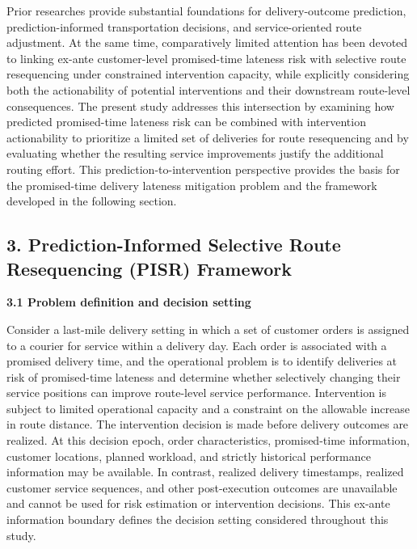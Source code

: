 \documentclass[
]{article}
\begin{document}
Prior researches provide substantial foundations for delivery-outcome
prediction, prediction-informed transportation decisions, and
service-oriented route adjustment. At the same time, comparatively
limited attention has been devoted to linking ex-ante customer-level
promised-time lateness risk with selective route resequencing under
constrained intervention capacity, while explicitly considering both the
actionability of potential interventions and their downstream
route-level consequences. The present study addresses this intersection
by examining how predicted promised-time lateness risk can be combined
with intervention actionability to prioritize a limited set of
deliveries for route resequencing and by evaluating whether the
resulting service improvements justify the additional routing effort.
This prediction-to-intervention perspective provides the basis for the
promised-time delivery lateness mitigation problem and the framework
developed in the following section.

\subsection{\texorpdfstring{\textbf{3. Prediction-Informed Selective
Route Resequencing (PISR)
Framework}}{3. Prediction-Informed Selective Route Resequencing (PISR) Framework}}\label{prediction-informed-selective-route-resequencing-pisr-framework}

\textbf{3.1 Problem definition and decision setting}

Consider a last-mile delivery setting in which a set of customer orders
is assigned to a courier for service within a delivery day. Each order
is associated with a promised delivery time, and the operational problem
is to identify deliveries at risk of promised-time lateness and
determine whether selectively changing their service positions can
improve route-level service performance. Intervention is subject to
limited operational capacity and a constraint on the allowable increase
in route distance. The intervention decision is made before delivery
outcomes are realized. At this decision epoch, order characteristics,
promised-time information, customer locations, planned workload, and
strictly historical performance information may be available. In
contrast, realized delivery timestamps, realized customer service
sequences, and other post-execution outcomes are unavailable and cannot
be used for risk estimation or intervention decisions. This ex-ante
information boundary defines the decision setting considered throughout
this study.
\end{document}
